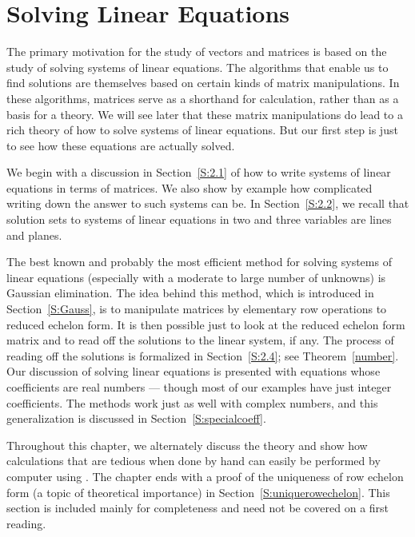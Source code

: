 \chapter{Solving Linear Equations} \label{lineq}

\normalsize

The primary motivation for the study of vectors and matrices is based
on the study of solving systems of linear equations.  The algorithms
that enable us to find solutions are themselves based on certain kinds
of matrix manipulations.  In these algorithms, matrices serve as a
shorthand for calculation, rather than as a basis for a theory.  We will
see later that these matrix manipulations do lead to a rich theory of how
to solve systems of linear equations.  But our first step is just to see
how these equations are actually solved.

We begin with a discussion in Section~\ref{S:2.1} of how to write systems
of linear equations in terms of matrices.  We also show by example how
complicated writing down the answer to such systems can be.  In
Section~\ref{S:2.2}, we recall that solution sets to systems of linear
equations in two and three variables are lines and planes.

The best known and probably the most efficient method for solving
systems of linear equations (especially with a moderate to large number
of unknowns) is Gaussian elimination.  The idea behind this method,
which is introduced in Section~\ref{S:Gauss}, is to manipulate matrices
by elementary row operations to reduced echelon form.  It is then possible
just to look at the reduced echelon form matrix and to read off the
solutions to the linear system, if any.  The process of reading off the
solutions is formalized in Section~\ref{S:2.4}; see Theorem~\ref{number}.
Our discussion of solving linear equations is presented with equations
whose coefficients are real numbers --- though most of our examples have
just integer coefficients.  The methods work just as well with complex
numbers, and this generalization is discussed in Section~\ref{S:specialcoeff}.

Throughout this chapter, we alternately discuss the theory and show how
calculations that are tedious when done by hand can easily be performed
by computer using \Matlabp.  The chapter ends with a proof of the
uniqueness of row echelon form (a topic of theoretical importance) in
Section~\ref{S:uniquerowechelon}.  This section is included mainly for
completeness and need not be covered on a first reading.


